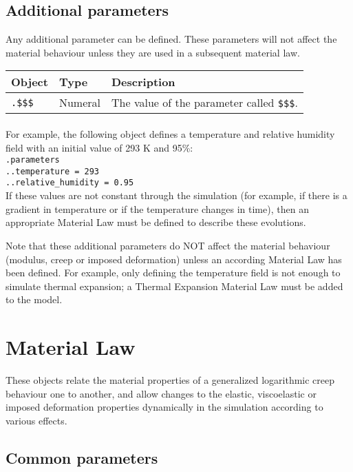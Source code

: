 \documentclass[10pt]{article}
\begin{document}
\subsection{Additional parameters}

Any additional parameter can be defined. These parameters will not affect the material behaviour unless they are used in a subsequent material law.\\

\begin{tabularx}{\textwidth}{llX}
\hline 
Object & Type & Description \\ 
\hline 
\verb+.$$$+ & Numeral & The value of the parameter called \verb+$$$+.\\
\hline 
\end{tabularx}

\paragraph{} For example, the following object defines a temperature and relative humidity field with an initial value of 293 K and 95\%:\\
\verb+.parameters+\\
\verb+..temperature = 293+\\
\verb+..relative_humidity = 0.95+\\

If these values are not constant through the simulation (for example, if there is a gradient in temperature or if the temperature changes in time), then an appropriate Material Law must be defined to describe these evolutions.

Note that these additional parameters do NOT affect the material behaviour (modulus, creep or imposed deformation) unless an according Material Law has been defined. For example, only defining the temperature field is not enough to simulate thermal expansion; a Thermal Expansion Material Law must be added to the model.

\section{Material Law}

These objects relate the material properties of a generalized logarithmic creep behaviour one to another, and allow changes to the elastic, viscoelastic or imposed deformation properties dynamically in the simulation according to various effects.

\subsection{Common parameters}
\end{document}

